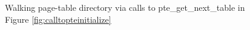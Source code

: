 \begin{figure}
\fi
\vspace{-1em}
\caption{Walking page-table directory via calls to \textsf{pte\_get\_next\_table} in Figure \ref{fig:calltopteinitialize}}
\label{walkpgdir}
\vspace{-1em}
\end{figure}

